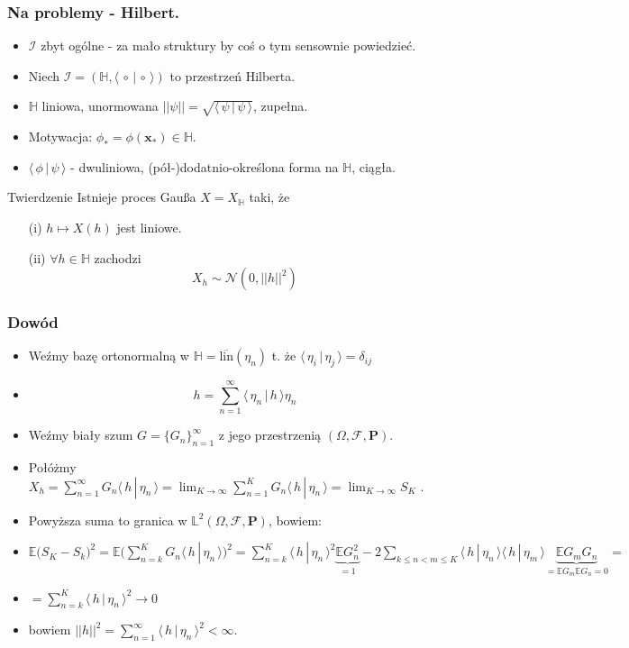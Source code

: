 \documentclass[draft, xetex]{beamer}
\newcommand{\xxx}{\mathbf{x}}
\newcommand{\HI}[2]{\langle \,#1 \,|\, #2\, \rangle}
\begin{document}
\begin{frame}
	\frametitle{Na problemy - Hilbert.}
	
	\begin{itemize}
		\item $\mathcal{I}$ zbyt ogólne - za mało struktury by coś o tym sensownie powiedzieć.
	 	\item Niech $\mathcal{I} = (\mathbb{H}, \HI{\circ}{\circ})$ to przestrzeń Hilberta.
	    \item $\mathbb{H}$ liniowa, unormowana $||\psi|| = \sqrt{\HI{\psi}{\psi}}$, zupełna.
	 
		\item Motywacja: $\phi_* = \phi(\xxx_*) \in \mathbb{H}$.
		\item $\HI{\phi}{\psi}$ - dwuliniowa, (pół-)dodatnio-określona forma na $\mathbb{H}$, ciągła.
	\end{itemize}
	
	\begin{block}{Twierdzenie}
		Istnieje proces Gau\ss a $X = X_{\mathbb{H}}$ taki, że
		\begin{itemize}
			\item[(i)] $h \mapsto X(h)$ jest liniowe.
			\item[(ii)] $\forall h\in \mathbb{H}$ zachodzi $$X_h \sim \mathcal{N}(0, ||h||^2)$$ 	
		\end{itemize}		 
	\end{block}
\end{frame}

\begin{frame}
	\frametitle{Dowód}
	
		\begin{itemize}
			\item Weźmy bazę ortonormalną w $\mathbb{H} = \overline{\mathrm{lin}} ( \eta_n) $ t. że $\HI{\eta_i}{\eta_j} = \delta_{ij}$
			\item $$ h = \sum_{n=1}^\infty \HI{\eta_n}{h}\eta_n$$	
			\item Weźmy biały szum $G = \{G_n \}_{n=1}^\infty$ z jego przestrzenią $(\Omega, \mathcal{F}, \mathbf{P})$.
			\item Połóżmy $X_h = \sum_{n=1}^{\infty} G_n \HI{h}{\eta_n} = \lim_{K \rightarrow \infty} \sum_{n=1}^{K} G_n \HI{h}{\eta_n} = \lim_{K \rightarrow \infty} S_K$	.	
			\item Powyższa suma to granica w $\mathbb{L}^2(\Omega, \mathcal{F}, \mathbf{P})$, bowiem:
			\item $\mathbb{E}\Big( S_K - S_k\Big)^2 =\mathbb{E}\Big(\sum_{n = k}^{K} G_n \HI{h}{\eta_n} \Big)^2 = \sum_{n=k}^K \HI{h}{\eta_n}^2 \underbrace{\mathbb{E} G_n^2}_{=1} - 2 \sum_{k \leq n < m \leq K} \HI{h}{\eta_n}\HI{h}{\eta_m} \underbrace{\mathbb{E} G_m G_n}_{=\mathbb{E} G_m \mathbb{E}G_n = 0}=$
			\item $= \sum_{n=k}^K \HI{h}{\eta_n}^2 \rightarrow 0$ 
			\item bowiem $||h||^2 = \sum_{n=1}^{\infty} \HI{h}{\eta_n}^2 < \infty$.
		\end{itemize}
\end{frame}
\end{document}
